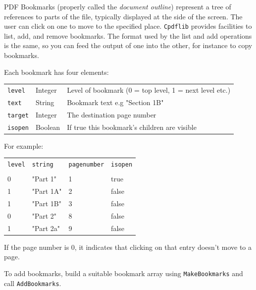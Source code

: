 \documentclass[a4paper]{memoir}
\begin{document}
PDF Bookmarks (properly called the \textit{document outline}) represent a tree
of references to parts of the file, typically displayed at the side of the
screen. The user can click on one to move to the specified place.
\verb!Cpdflib! provides facilities to list, add, and remove bookmarks. The
format used by the list and add operations is the same, so you can feed the
output of one into the other, for instance to copy bookmarks.

Each bookmark has four elements:
\begin{framed}
\begin{tabular}{lll}
\verb!level! & Integer & Level of bookmark (0 = top level, 1 = next level etc.)\\
\verb!text! & String & Bookmark text e.g "Section 1B"\\
\verb!target! & Integer & The destination page number\\
\verb!isopen! & Boolean & If true this bookmark's children are visible
\end{tabular}
\end{framed}
For example:
\begin{framed}
\begin{tabular}{llll}
\texttt{level} & \texttt{string} & \texttt{pagenumber} & \texttt{isopen}\\\\
0 & "Part 1" & 1 & true\\
1 & "Part 1A" & 2 & false\\
1 & "Part 1B" & 3 & false\\
0 & "Part 2" & 8 & false\\
1 & "Part 2a" & 9 & false
\end{tabular}
\end{framed}

If the page number is 0, it indicates that clicking on that entry doesn't move to a page.

To add bookmarks, build a suitable bookmark array using \verb!MakeBookmarks! and call \verb!AddBookmarks!.
\end{document}
